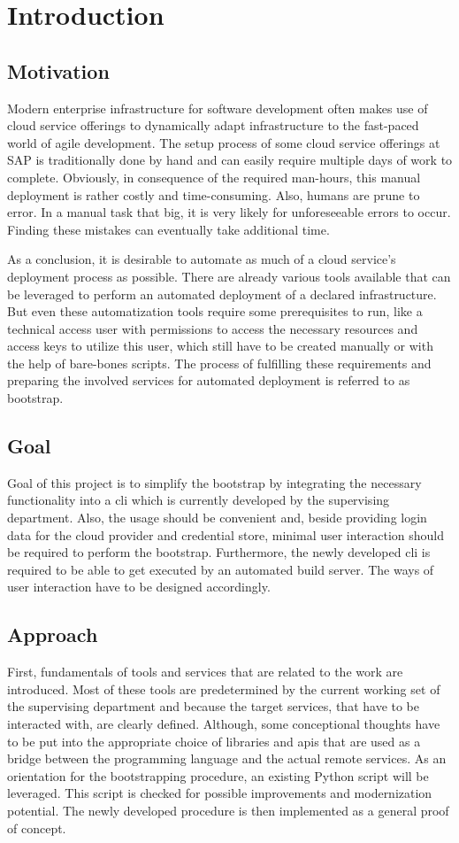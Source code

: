 \chapter{Introduction}
\section{Motivation}
Modern enterprise infrastructure for software development often makes use of cloud service offerings to dynamically adapt infrastructure to the fast-paced world of agile development.
The setup process of some cloud service offerings at SAP is traditionally done by hand and can easily require multiple days of work to complete.
Obviously, in consequence of the required man-hours, this manual deployment is rather costly and time-consuming.
Also, humans are prune to error.
In a manual task that big, it is very likely for unforeseeable errors to occur.
Finding these mistakes can eventually take additional time.

As a conclusion, it is desirable to automate as much of a cloud service's deployment process as possible.
There are already various tools available that can be leveraged to perform an automated deployment of a declared infrastructure.
But even these automatization tools require some prerequisites to run, like a technical access user with permissions to access the necessary resources and access keys to utilize this user, which still have to be created manually or with the help of bare-bones scripts.
The process of fulfilling these requirements and preparing the involved services for automated deployment is referred to as bootstrap.

\section{Goal}
Goal of this project is to simplify the bootstrap by integrating the necessary functionality into a \acf{cli} which is currently developed by the supervising department.
Also, the usage should be convenient and, beside providing login data for the cloud provider and credential store, minimal user interaction should be required to perform the bootstrap.
Furthermore, the newly developed \ac{cli} is required to be able to get executed by an automated build server.
The ways of user interaction have to be designed accordingly.

\section{Approach}
First, fundamentals of tools and services that are related to the work are introduced.
Most of these tools are predetermined by the current working set of the supervising department and because the target services, that have to be interacted with, are clearly defined.
Although, some conceptional thoughts have to be put into the appropriate choice of libraries and \acp{api} that are used as a bridge between the programming language and the actual remote services.
As an orientation for the bootstrapping procedure, an existing Python script will be leveraged.
This script is checked for possible improvements and modernization potential.
The newly developed procedure is then implemented as a general proof of concept.

